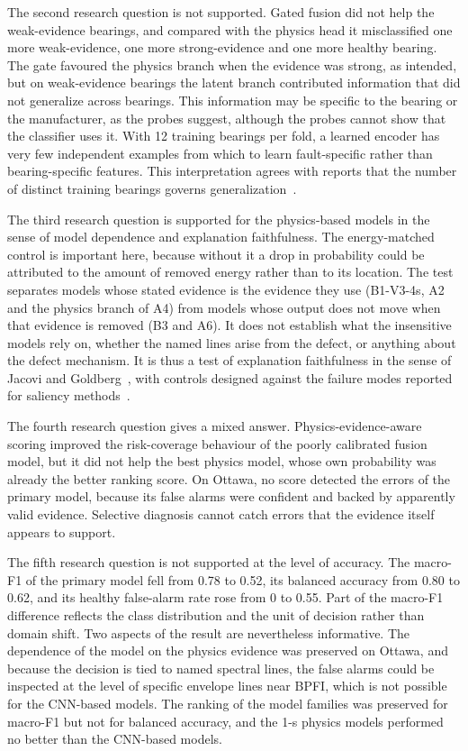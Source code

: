 \documentclass[10pt,letterpaper]{article}
\begin{document}
The second research question is not supported. Gated fusion did not help the weak-evidence bearings, and compared with the physics head it misclassified one more weak-evidence, one more strong-evidence and one more healthy bearing. The gate favoured the physics branch when the evidence was strong, as intended, but on weak-evidence bearings the latent branch contributed information that did not generalize across bearings. This information may be specific to the bearing or the manufacturer, as the probes suggest, although the probes cannot show that the classifier uses it. With 12 training bearings per fold, a learned encoder has very few independent examples from which to learn fault-specific rather than bearing-specific features. This interpretation agrees with reports that the number of distinct training bearings governs generalization~\cite{vieira2026towards,wheat2024impact}.

The third research question is supported for the physics-based models in the sense of model dependence and explanation faithfulness. The energy-matched control is important here, because without it a drop in probability could be attributed to the amount of removed energy rather than to its location. The test separates models whose stated evidence is the evidence they use (B1-V3-4s, A2 and the physics branch of A4) from models whose output does not move when that evidence is removed (B3 and A6). It does not establish what the insensitive models rely on, whether the named lines arise from the defect, or anything about the defect mechanism. It is thus a test of explanation faithfulness in the sense of Jacovi and Goldberg~\cite{jacovi2020towards}, with controls designed against the failure modes reported for saliency methods~\cite{adebayo2018sanity,hooker2019benchmark}.

The fourth research question gives a mixed answer. Physics-evidence-aware scoring improved the risk-coverage behaviour of the poorly calibrated fusion model, but it did not help the best physics model, whose own probability was already the better ranking score. On Ottawa, no score detected the errors of the primary model, because its false alarms were confident and backed by apparently valid evidence. Selective diagnosis cannot catch errors that the evidence itself appears to support.

The fifth research question is not supported at the level of accuracy. The macro-F1 of the primary model fell from 0.78 to 0.52, its balanced accuracy from 0.80 to 0.62, and its healthy false-alarm rate rose from 0 to 0.55. Part of the macro-F1 difference reflects the class distribution and the unit of decision rather than domain shift. Two aspects of the result are nevertheless informative. The dependence of the model on the physics evidence was preserved on Ottawa, and because the decision is tied to named spectral lines, the false alarms could be inspected at the level of specific envelope lines near BPFI, which is not possible for the CNN-based models. The ranking of the model families was preserved for macro-F1 but not for balanced accuracy, and the 1-s physics models performed no better than the CNN-based models.
\end{document}

